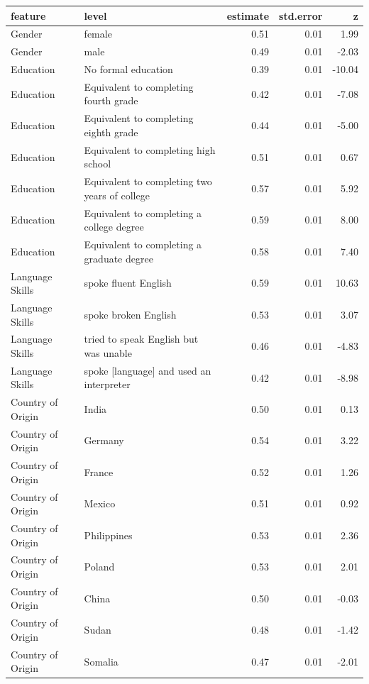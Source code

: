 \documentclass[a4paper,12pt]{article}\usepackage[]{graphicx}\usepackage[]{color}
\begin{document}
\begin{table}[ht]
\centering
\begingroup\scriptsize
\begin{tabular}{lp{3in}rrr}
  \hline
feature & level & estimate & std.error & z \\ 
  \hline
Gender & female & 0.51 & 0.01 & 1.99 \\ 
  Gender & male & 0.49 & 0.01 & -2.03 \\ 
  Education & No formal education & 0.39 & 0.01 & -10.04 \\ 
  Education & Equivalent to completing fourth grade & 0.42 & 0.01 & -7.08 \\ 
  Education & Equivalent to completing eighth grade & 0.44 & 0.01 & -5.00 \\ 
  Education & Equivalent to completing high school & 0.51 & 0.01 & 0.67 \\ 
  Education & Equivalent to completing two years of college & 0.57 & 0.01 & 5.92 \\ 
  Education & Equivalent to completing a college degree & 0.59 & 0.01 & 8.00 \\ 
  Education & Equivalent to completing a graduate degree & 0.58 & 0.01 & 7.40 \\ 
  Language Skills & spoke fluent English & 0.59 & 0.01 & 10.63 \\ 
  Language Skills & spoke broken English & 0.53 & 0.01 & 3.07 \\ 
  Language Skills & tried to speak English but was unable & 0.46 & 0.01 & -4.83 \\ 
  Language Skills & spoke [language] and used an interpreter & 0.42 & 0.01 & -8.98 \\ 
  Country of Origin & India & 0.50 & 0.01 & 0.13 \\ 
  Country of Origin & Germany & 0.54 & 0.01 & 3.22 \\ 
  Country of Origin & France & 0.52 & 0.01 & 1.26 \\ 
  Country of Origin & Mexico & 0.51 & 0.01 & 0.92 \\ 
  Country of Origin & Philippines & 0.53 & 0.01 & 2.36 \\ 
  Country of Origin & Poland & 0.53 & 0.01 & 2.01 \\ 
  Country of Origin & China & 0.50 & 0.01 & -0.03 \\ 
  Country of Origin & Sudan & 0.48 & 0.01 & -1.42 \\ 
  Country of Origin & Somalia & 0.47 & 0.01 & -2.01 \\ 

\end{tabular}
\end{table}
\end{document}

